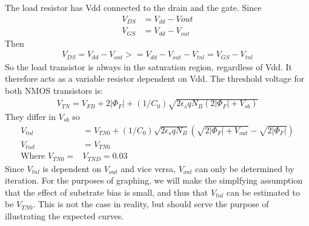 \documentclass{article}
\begin{document}
The load resistor has Vdd connected to the drain and the gate. Since
\begin{align*}
V_{DS} &= V_{dd} - V{out} \\
V_{GS} &= V_{dd} - V_{out}
\end{align*} 
Then 
\begin{align*}
V_{DS} = V_{dd} - V_{out} >= V_{dd} - V_{out} - V_{tnl} = V_{GS} - V_{tnl}
\end{align*}
So the load transistor is always in the saturation region, regardless of Vdd. It therefore acts as a variable resistor dependent on Vdd. The threshold voltage for both NMOS transistors is:
\begin{align*}
V_{TN} = V_{FB} + 2|\Phi_F| + (1/C_0)\sqrt{2\epsilon_s q N_B (2|\Phi_F| + V_{sb})}
\end{align*}
They differ in $V_{sb}$ so 
\begin{align*}
V_{tnl} &= V_{TN0} + (1/C_0)\sqrt{2\epsilon_s q N_B}(\sqrt{2|\Phi_F| + V_{out}} - \sqrt{2|\Phi_F|}) \\
V_{tnd} &= V_{TN0} \\
\text{Where } V_{TN0} =& V_{TND} = 0.03
\end{align*}
Since $V_{tnl}$ is dependent on $V_{out}$ and vice versa, $V_{out}$ can only be determined by iteration. For the purposes of graphing, we will make the simplfying assumption that the effect of substrate bias is small, and thus that $V_{tnl}$ can be estimated to be $V_{TN0}$. This is not the case in reality, but should serve the purpose of illustrating the expected curves.
\end{document}
